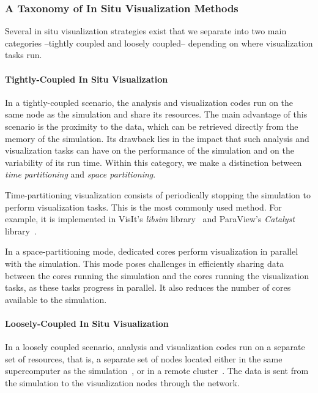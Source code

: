 	\subsubsection{A Taxonomy of In Situ Visualization Methods}

	Several in situ visualization strategies exist that we separate into two main categories 
	--tightly coupled and loosely coupled-- depending on where visualization tasks run.

		\paragraph{Tightly-Coupled In Situ Visualization} 
		In a tightly-coupled scenario, the analysis and visualization codes run on the same node 
		as the simulation and share its resources. The main advantage of this scenario is the proximity 
		to the data, which can be retrieved directly from the memory of the simulation. 
		Its drawback lies in the impact that such analysis and visualization tasks can have on the performance 
		of the simulation and on the variability of its run time. Within this category, we make a distinction between
		\emph{time partitioning} and \emph{space partitioning}. 
		
		Time-partitioning visualization consists of periodically stopping the simulation to perform visualization tasks. 
		This is the most commonly used method. For example, it is implemented in VisIt's \emph{libsim}
		library~\cite{whitlock2011parallel} and ParaView's \emph{Catalyst} 
		library~\cite{fabian2011paraview,catalyst}.

		In a space-partitioning mode, dedicated cores perform visualization in parallel with the simulation.
		This mode poses challenges in efficiently sharing data between the cores running the simulation and
		the cores running the visualization tasks, as these tasks progress in parallel. It also
		reduces the number of cores available to the simulation.
		
		\paragraph{Loosely-Coupled In Situ Visualization} 
		In a loosely coupled scenario, analysis and visualization codes run on a separate set of
		resources, that is, a separate set of nodes located either in the same supercomputer as
		the simulation~\cite{zheng2010predata,rasquin2011electronic}, 
		or in a remote cluster~\cite{malakar2010adaptive}. 
		The data is sent from the simulation to the visualization nodes through the network. 
		
